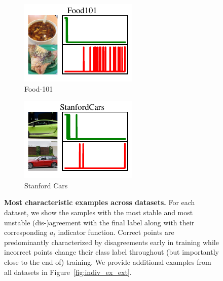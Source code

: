 \begin{figure}[t]
\begin{subfigure}[b]{0.23\linewidth}
  \includegraphics[width=\linewidth]{figs/sptd/food_points.pdf}
  \caption{Food-101}
\end{subfigure}
\hfill
\begin{subfigure}[b]{0.23\linewidth}
  \centering
  \includegraphics[width=\linewidth]{figs/sptd/cars_points.pdf}
  \caption{Stanford Cars}
\end{subfigure}

\caption[\textbf{Most characteristic examples across datasets.}]{\textbf{Most characteristic examples across datasets.} For each dataset, we show the samples with the most stable and most unstable (dis-)agreement with the final label along with their corresponding $a_t$ indicator function. Correct points are predominantly characterized by disagreements early in training while incorrect points change their class label throughout (but importantly close to the end of) training. We provide additional examples from all datasets in Figure~\ref{fig:indiv_ex_ext}.}
\label{fig:indiv_ex}
\end{figure}


